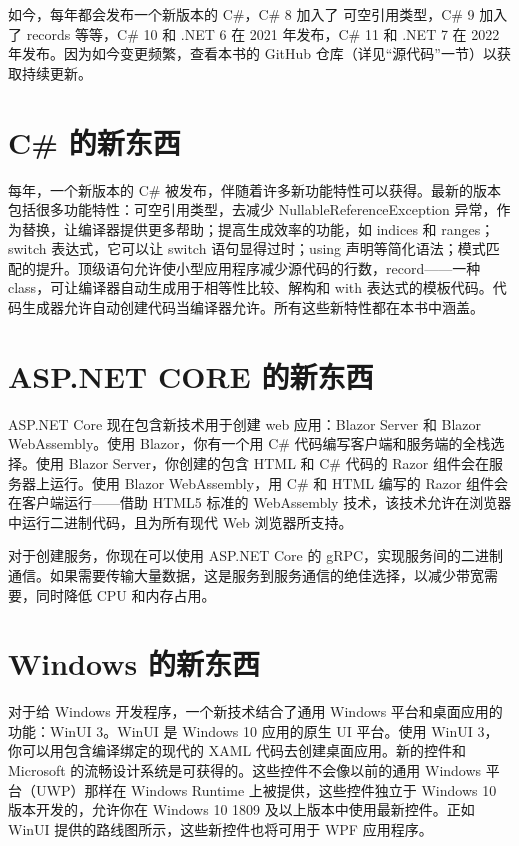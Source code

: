 如今，每年都会发布一个新版本的 C\#，C\# 8 加入了 可空引用类型，C\# 9 加入了 records 等等，C\# 10 和 .NET 6 在 2021 年发布，C\# 11 和 .NET 7 在 2022 年发布。因为如今变更频繁，查看本书的 GitHub 仓库（详见“源代码”一节）以获取持续更新。

\section*{C\# 的新东西}
每年，一个新版本的 C\# 被发布，伴随着许多新功能特性可以获得。最新的版本包括很多功能特性：可空引用类型，去减少 NullableReferenceException 异常，作为替换，让编译器提供更多帮助；提高生成效率的功能，如 indices 和 ranges；switch 表达式，它可以让 switch 语句显得过时；using 声明等简化语法；模式匹配的提升。顶级语句允许使小型应用程序减少源代码的行数，record——一种 class，可让编译器自动生成用于相等性比较、解构和 with 表达式的模板代码。代码生成器允许自动创建代码当编译器允许。所有这些新特性都在本书中涵盖。

\section*{ASP.NET CORE 的新东西}
ASP.NET Core 现在包含新技术用于创建 web 应用：Blazor Server 和 Blazor WebAssembly。使用 Blazor，你有一个用 C\# 代码编写客户端和服务端的全栈选择。使用 Blazor Server，你创建的包含 HTML 和 C\# 代码的 Razor 组件会在服务器上运行。使用 Blazor WebAssembly，用 C\# 和 HTML 编写的 Razor 组件会在客户端运行——借助 HTML5 标准的 WebAssembly 技术，该技术允许在浏览器中运行二进制代码，且为所有现代 Web 浏览器所支持。

对于创建服务，你现在可以使用 ASP.NET Core 的 gRPC，实现服务间的二进制通信。如果需要传输大量数据，这是服务到服务通信的绝佳选择，以减少带宽需要，同时降低 CPU 和内存占用。

\section*{Windows 的新东西}
对于给 Windows 开发程序，一个新技术结合了通用 Windows 平台和桌面应用的功能：WinUI 3。WinUI 是 Windows 10 应用的原生 UI 平台。使用 WinUI 3，你可以用包含编译绑定的现代的 XAML 代码去创建桌面应用。新的控件和 Microsoft 的流畅设计系统是可获得的。这些控件不会像以前的通用 Windows 平台（UWP）那样在 Windows Runtime 上被提供，这些控件独立于 Windows 10 版本开发的，允许你在 Windows 10 1809 及以上版本中使用最新控件。正如 WinUI 提供的路线图所示，这些新控件也将可用于 WPF 应用程序。

